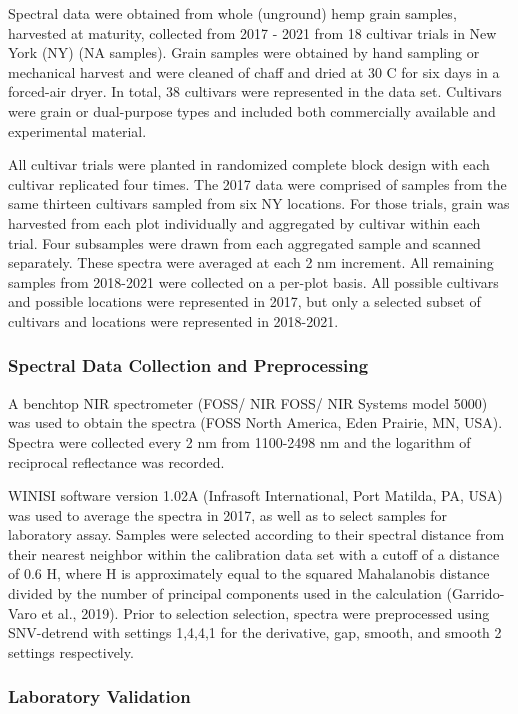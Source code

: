 \documentclass[
]{agujournal2019}
\begin{document}
Spectral data were obtained from whole (unground) hemp grain samples,
harvested at maturity, collected from 2017 - 2021 from 18 cultivar
trials in New York (NY) (NA samples). Grain samples were obtained by
hand sampling or mechanical harvest and were cleaned of chaff and dried
at 30 C for six days in a forced-air dryer. In total, 38 cultivars were
represented in the data set. Cultivars were grain or dual-purpose types
and included both commercially available and experimental material.

All cultivar trials were planted in randomized complete block design
with each cultivar replicated four times. The 2017 data were comprised
of samples from the same thirteen cultivars sampled from six NY
locations. For those trials, grain was harvested from each plot
individually and aggregated by cultivar within each trial. Four
subsamples were drawn from each aggregated sample and scanned
separately. These spectra were averaged at each 2 nm increment. All
remaining samples from 2018-2021 were collected on a per-plot basis. All
possible cultivars and possible locations were represented in 2017, but
only a selected subset of cultivars and locations were represented in
2018-2021.

\subsubsection{Spectral Data Collection and
Preprocessing}\label{spectral-data-collection-and-preprocessing}

A benchtop NIR spectrometer (FOSS/ NIR FOSS/ NIR Systems model 5000) was
used to obtain the spectra (FOSS North America, Eden Prairie, MN, USA).
Spectra were collected every 2 nm from 1100-2498 nm and the logarithm of
reciprocal reflectance was recorded.

WINISI software version 1.02A (Infrasoft International, Port Matilda,
PA, USA) was used to average the spectra in 2017, as well as to select
samples for laboratory assay. Samples were selected according to their
spectral distance from their nearest neighbor within the calibration
data set with a cutoff of a distance of 0.6 H, where H is approximately
equal to the squared Mahalanobis distance divided by the number of
principal components used in the calculation (Garrido-Varo et al.,
2019). Prior to selection selection, spectra were preprocessed using
SNV-detrend with settings 1,4,4,1 for the derivative, gap, smooth, and
smooth 2 settings respectively.

\subsubsection{Laboratory Validation}\label{laboratory-validation}
\end{document}
